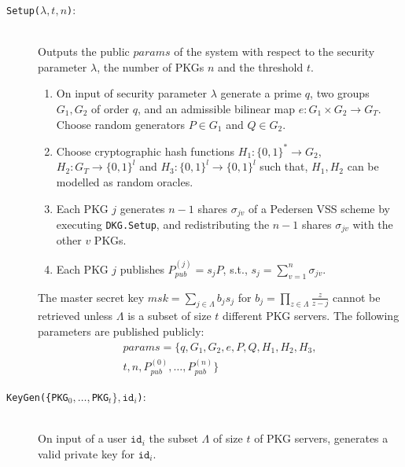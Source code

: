 \documentclass[journal]{IEEEtran}
\newcommand{\id}[1]{\ensuremath{\mathtt{id}_{#1}}}
\begin{document}
\begin{description}
    \item[\texttt{Setup($\lambda, t, n$)}:]~\\ Outputs the public $params$ of the system with respect to the security parameter $\lambda$, the number of PKGs $n$ and the threshold $t$.
    \begin{enumerate}
        \item On input of security parameter $\lambda$ generate a prime $q$, two groups $G_1, G_2$ of order $q$, and an admissible bilinear map $e: G_1 \times G_2 \rightarrow G_T$. Choose random generators $P \in G_1$ and $Q \in G_2$. 
    
        \item Choose cryptographic hash functions $H_1: \{ 0,1 \}^{*} \rightarrow G_2$, ${H_2: G_T \rightarrow \{ 0,1 \}^{l}}$ and $H_3: \{ 0, 1 \}^{l} \rightarrow \{ 0,1 \}^{l}$ such that, $H_1, H_2$ can be modelled as random oracles.
        
        \item Each PKG $j$ generates $n-1$ shares $\sigma_{jv}$ of a Pedersen VSS scheme by executing \texttt{DKG.Setup}, and redistributing the $n-1$ shares $\sigma_{jv}$ with the other $v$ PKGs.

        \item Each PKG $j$ publishes $P_{pub}^{(j)} = s_j P$, s.t., $s_j=\sum_{v=1}^n \sigma_{jv}$.
    \end{enumerate}
    
    The master secret key $msk = \sum_{j \in \Lambda} b_j s_j$ for $b_j = \prod_{z \in \Lambda} \frac{z}{z-j}$ cannot be retrieved unless $\Lambda$ is a subset of size $t$ different PKG servers. The following parameters are published publicly:
    \begin{equation*}
    \begin{split}
    params = \{ q, G_1, G_2, e, P, Q, H_1, H_2, H_3, \\ t, n, P_{pub}^{(0)}, \ldots, P_{pub}^{(n)} \}
    \end{split}
    \end{equation*}
    
    \bigskip

    \item[\texttt{KeyGen(\{PKG$_0,\ldots,$PKG$_t\}, \id{i}$)}:]~\\ On input of a user $\id{i}$ the subset $\Lambda$ of size $t$ of PKG servers, generates a valid private key for \id{i}. 
    

\end{description}
\end{document}
